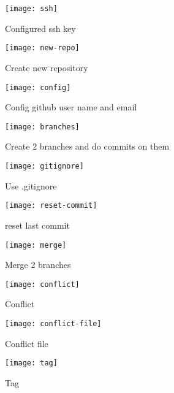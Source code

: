 \begin{center}
	\begin{figure}[h]
		\centering
		\texttt{[image: ssh]}\\
		\caption{Configured ssh key}
		\label{run}
	\end{figure}
	
	\begin{figure}[h]
		\centering
		\texttt{[image: new-repo]}\\
		\caption{Create new repository}
		\label{jump}
	\end{figure}
	
	\begin{figure}[h]
		\centering
		\texttt{[image: config]}\\
		\caption{Config github user name and email}
		\label{slide}
	\end{figure}
	
	\begin{figure}[h]
		\centering
		\texttt{[image: branches]}\\
		\caption{Create 2 branches and do commits on them}
		\label{run}
	\end{figure}
	
	\begin{figure}[h]
		\centering
		\texttt{[image: gitignore]}\\
		\caption{Use .gitignore}
		\label{jump}
	\end{figure}
	
	\begin{figure}[h]
		\centering
		\texttt{[image: reset-commit]}\\
		\caption{reset last commit}
		\label{slide}
	\end{figure}
	
	\begin{figure}[h]
		\centering
		\texttt{[image: merge]}\\
		\caption{Merge 2 branches}
		\label{run}
	\end{figure}
	
	\begin{figure}[h]
		\centering
		\texttt{[image: conflict]}\\
		\caption{Conflict}
		\label{jump}
	\end{figure}
	
	\begin{figure}[h]
		\centering
		\texttt{[image: conflict-file]}\\
		\caption{Conflict file}
		\label{slide}
	\end{figure}
	
	\begin{figure}[h]
		\centering
		\texttt{[image: tag]}\\
		\caption{Tag}
		\label{slide}
	\end{figure}
\end{center}

\clearpage